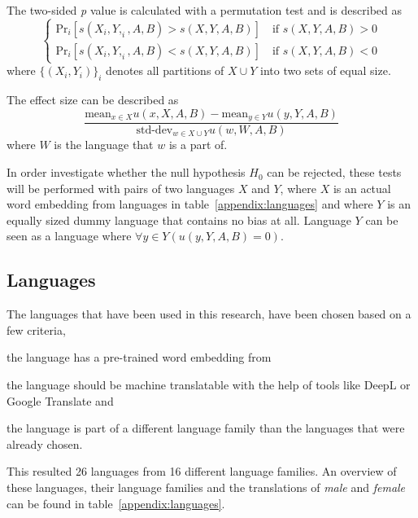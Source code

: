 The two-sided \emph{p} value is calculated with a permutation test and is described as
$$
\begin{cases}
    \text{Pr}_i[s(X_i, Y,_i, A, B) > s(X,Y,A,B)] \quad \text{if } s(X,Y,A,B) > 0 \\
    \text{Pr}_i[s(X_i, Y,_i, A, B) < s(X,Y,A,B)] \quad \text{if } s(X,Y,A,B) < 0
\end{cases}
$$
where $\{(X_i, Y_i)\}_i$ denotes all partitions of $X \cup Y$ into two sets of equal 
size.

The effect size can be described as
$$
\frac{
    \text{mean}_{x \in X} u(x, X, A, B) - \text{mean}_{y \in Y} u(y, Y, A, B)
}{
    \text{std-dev}_{w \in X \cup Y} u(w,W,A,B)
}
$$
where $W$ is the language that $w$ is a part of.

In order investigate whether the null hypothesis $H_0$ can be rejected, these tests will
be performed with pairs of two languages $X$ and $Y$, where $X$ is an actual word embedding
from languages in table~\ref{appendix:languages} and where $Y$ is an equally sized dummy
language that
contains no bias at all. Language $Y$ can be seen as a language where
$\forall y \in Y(u(y,Y,A,B) = 0)$.

\subsection{Languages}
The languages that have been used in this research, have been chosen based on a
few criteria,
\begin{seriate}
    \item the language has a pre-trained word embedding from \textcite{grave2018learning}
    \item the language should be machine translatable with the help of tools like DeepL or
    Google Translate and
    \item the language is part of a different language family than the languages that
    were already chosen.
\end{seriate}
This resulted 26 languages from 16 different language families. An overview of these languages, their language families and the translations of \textit{male} and \textit{female}
can be found in table~\ref{appendix:languages}.
